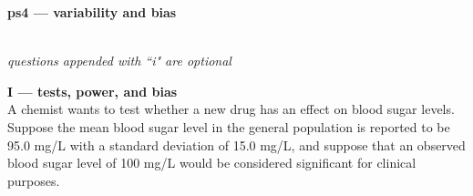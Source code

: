 \documentclass[10pt]{extarticle}
\begin{document}
\setlength{\parindent}{0pt}





{\bf \huge ps4 --- variability and bias} 

\hrulefill \\

{\it questions appended with ``i" are optional} \\

\hfill



{\Large \bf I --- tests, power, and bias} \\

A chemist wants to test whether a new drug has an effect on blood sugar levels. Suppose the mean blood sugar level in the general population is reported to be 95.0 mg/L with a standard deviation of 15.0 mg/L, and suppose that an observed blood sugar level of 100 mg/L would be considered significant for clinical purposes.  \\ 
\end{document}
